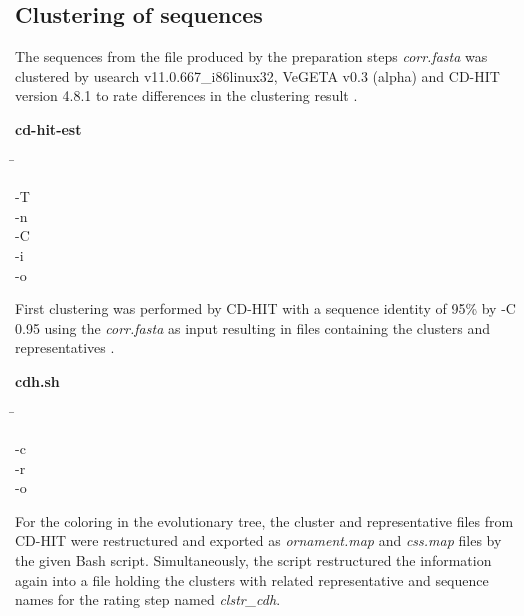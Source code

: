 \subsection{Clustering of sequences} \label{subsec:2.2.2}

    The sequences from the file produced by the preparation steps \textit{corr.fasta} was clustered by usearch v11.0.667\_i86linux32, VeGETA v0.3 (alpha) and CD-HIT version 4.8.1 to rate differences in the clustering result \autocite{Usearch, CD-HIT, vegeta}.

    \begin{leftbar}
        \textbf{cd-hit-est}
        \begin{nstabbing}
            \qquad \= \kill
        
            -T \\
            
            -n \\
        
            -C \\
        
            -i \\
            
            -o 
        \end{nstabbing}
    \end{leftbar}
    
    First clustering was performed by CD-HIT with a sequence identity of 95\% by \colorbox{backcolour}{-C 0.95} using the \textit{corr.fasta} as input resulting in files containing the clusters and representatives \autocite{CD-HIT}.
    
    \begin{leftbar}
        \textbf{cdh.sh}
        \begin{nstabbing}
            \qquad \= \kill
        
            -c \\
        
            -r \\
            
            -o 
        \end{nstabbing}
    \end{leftbar}
    
    For the coloring in the evolutionary tree, the cluster and representative files from CD-HIT were restructured and exported as \textit{ornament.map} and \textit{css.map} files by the given Bash script. Simultaneously, the script restructured the information again into a file holding the clusters with related representative and sequence names for the rating step named \textit{clstr\_cdh}.
    
